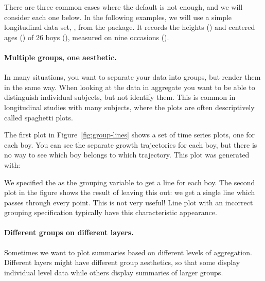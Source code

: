 There are three common cases where the default is not enough, and we will consider each one below.  In the following examples, we will use a simple longitudinal data set, , from the  package.  It records the heights () and centered ages () of 26 boys (), measured on nine occasions (). 

\paragraph{Multiple groups, one aesthetic.} In many situations, you want to separate your data into groups, but render them in the same way.  When looking at the data in aggregate you want to be able to distinguish individual subjects, but not identify them.  This is common in longitudinal studies with many subjects, where the plots are often descriptively called spaghetti plots.  

The first plot in Figure~\ref{fig:group-lines} shows a set of time series plots, one for each boy. You can see the separate growth trajectories for each boy, but there is no way to see which boy belongs to which trajectory.  This plot was generated with:

%


\noindent We specified the  as the grouping variable to get a line for each boy. The second plot in the figure shows the result of leaving this out: we get a single line which passes through every point.  This is not very useful! Line plot with an incorrect grouping specification typically have this characteristic appearance.

% 


\paragraph{Different groups on different layers.}  Sometimes we want to plot summaries based on different levels of aggregation. Different layers might have different group aesthetics, so that some display individual level data while others display summaries of larger groups.

